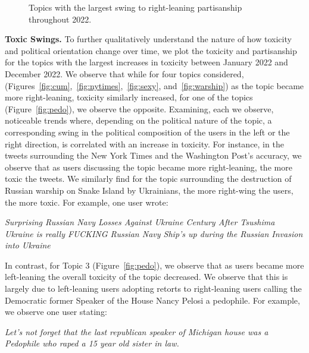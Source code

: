 \begin{figure}
\begin{subfigure}[l]{0.32\textwidth}
\caption{}
\label{fig:cornyn}
\end{subfigure}
\begin{minipage}[l]{1\textwidth}
\caption{Topics with the largest swing to right-leaning partisanship throughout 2022. \label{fig:conservative-swing}}
\end{minipage}
\end{figure}


\vspace{2pt}
\noindent
\textbf{Toxic Swings.} To further qualitatively understand the nature of how toxicity and political orientation change over time, we plot the toxicity and partisanship for the topics with the largest increases in toxicity between January 2022 and December 2022. We observe that while for four topics considered, (Figures~\ref{fig:cum},~\ref{fig:nytimes},~\ref{fig:sexy}, and~\ref{fig:warship}) as the topic became more right-leaning, toxicity similarly increased, for one of the topics (Figure~\ref{fig:pedo}), we observe the opposite. Examining, each we observe, noticeable trends where, depending on the political nature of the topic,  a corresponding swing in the political composition of the users in the left or the right direction, is correlated with an increase in toxicity. For instance, in the tweets surrounding the New York Times and the Washington Post's accuracy,  we observe that as users discussing the topic became more right-leaning, the more toxic the tweets. We similarly find for the topic surrounding the destruction of Russian warship on Snake Island by Ukrainians, the more right-wing the users, the more toxic. For example, one user wrote:
\begin{displayquote}
\small
\textit{
    Surprising Russian Navy Losses Against Ukraine Century After Tsushima 
Ukraine is really FUCKING Russian Navy Ship's up during the Russian Invasion into Ukraine}
\end{displayquote}

\noindent
In contrast, for Topic 3 (Figure~\ref{fig:pedo}), we observe that as users became more left-leaning the overall toxicity of the topic decreased. We observe that this is largely due to left-leaning users adopting retorts to right-leaning users calling the Democratic former Speaker of the House Nancy Pelosi a pedophile. For example, we observe one user stating:

\begin{displayquote}
\small
\textit{
Let's not forget that the last republican speaker of Michigan house was a Pedophile who raped a 15 year old sister in law.}
\end{displayquote}

